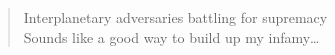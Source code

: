 \documentclass{article}
\begin{document}
\begin{quote}
    Interplanetary adversaries battling for supremacy\\
    Sounds like a good way to build up my infamy\dots~\cite{Deltron3030}
\end{quote}

\printbibliography
\end{document}
